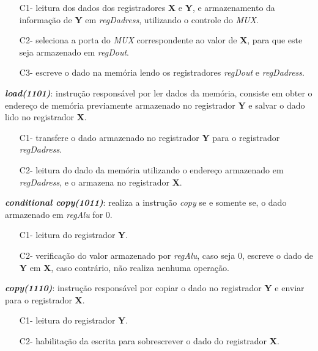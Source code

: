 \documentclass[12pt, a4paper]{article}
\begin{document}
	\begin{enumerate}
		\item[C1-] leitura dos dados dos registradores \textbf{X} e \textbf{Y}, e armazenamento da informação de \textbf{Y} em \textit{regDadress}, utilizando o controle do \textit{MUX}.
		
		\item[C2-] seleciona a porta do \textit{MUX} correspondente ao valor de \textbf{X}, para que este seja armazenado em \textit{regDout}.
		
		\item[C3-] escreve o dado na memória lendo os registradores \textit{regDout} e \textit{regDadress}.
	\end{enumerate}

	\par \textit{\textbf{load(1101)}}: instrução responsável por ler dados da memória, consiste em obter o endereço de memória previamente armazenado no registrador \textbf{Y} e salvar o dado lido no registrador \textbf{X}.
	
	\begin{enumerate}
		\item[C1-] transfere o dado armazenado no registrador \textbf{Y} para o registrador \textit{regDadress}.
		\item[C2-] leitura do dado da memória utilizando o endereço armazenado em \textit{regDadress}, e o armazena no registrador \textbf{X}.
	\end{enumerate}

	\par \textit{\textbf{conditional copy(1011)}}: realiza a instrução \textit{copy} se e somente se, o dado armazenado em \textit{regAlu} for 0.

	\begin{enumerate}
		\item[C1-] leitura do registrador \textbf{Y}.
		\item[C2-] verificação do valor armazenado por \textit{regAlu}, caso seja 0, escreve o dado de \textbf{Y} em \textbf{X}, caso contrário, não realiza nenhuma operação.
	\end{enumerate}

	\par \textit{\textbf{copy(1110)}}: instrução responsável por copiar o dado no registrador \textbf{Y} e enviar para o registrador \textbf{X}.
	
    \begin{enumerate}
        \item[C1-] leitura do registrador \textbf{Y}.
        \item[C2-] habilitação da escrita para sobrescrever o dado do registrador \textbf{X}.
    \end{enumerate}
\end{document}
